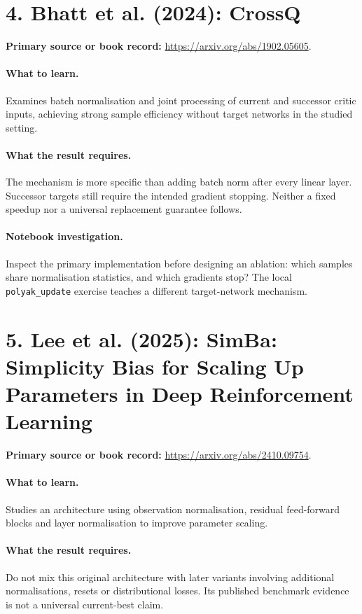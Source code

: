 \documentclass[11pt]{scrartcl}
\begin{document}
\section*{4. Bhatt et al. (2024): CrossQ}
\textbf{Primary source or book record:} \url{https://arxiv.org/abs/1902.05605}.

\paragraph{What to learn.} Examines batch normalisation and joint processing of current and successor critic inputs, achieving strong sample efficiency without target networks in the studied setting.

\paragraph{What the result requires.} The mechanism is more specific than adding batch norm after every linear layer. Successor targets still require the intended gradient stopping. Neither a fixed speedup nor a universal replacement guarantee follows.

\paragraph{Notebook investigation.} Inspect the primary implementation before designing an ablation: which samples share normalisation statistics, and which gradients stop? The local \texttt{polyak\_update} exercise teaches a different target-network mechanism.

\section*{5. Lee et al. (2025): SimBa: Simplicity Bias for Scaling Up Parameters in Deep Reinforcement Learning}
\textbf{Primary source or book record:} \url{https://arxiv.org/abs/2410.09754}.

\paragraph{What to learn.} Studies an architecture using observation normalisation, residual feed-forward blocks and layer normalisation to improve parameter scaling.

\paragraph{What the result requires.} Do not mix this original architecture with later variants involving additional normalisations, resets or distributional losses. Its published benchmark evidence is not a universal current-best claim.
\end{document}
